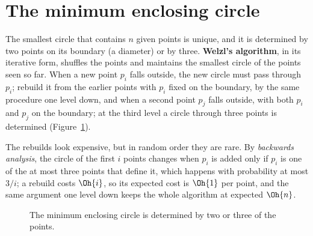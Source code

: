 \section[The minimum enclosing circle]{The minimum enclosing circle \hfill \ioi}\label{sec:mincircle}

The smallest circle that contains $n$ given points is unique, and it is determined by two points on its boundary (a diameter) or by
three. \textbf{Welzl's algorithm}, in its iterative form, shuffles the points and maintains the smallest circle of the points seen so far.
When a new point $p_i$ falls outside, the new circle must pass through $p_i$; rebuild it from the earlier points with $p_i$ fixed on the
boundary, by the same procedure one level down, and when a second point $p_j$ falls outside, with both $p_i$ and $p_j$ on the boundary; at
the third level a circle through three points is determined (Figure~\ref{fig:mincircle}).

The rebuilds look expensive, but in random order they are rare. By \emph{backwards analysis}, the circle of the first $i$ points changes
when $p_i$ is added only if $p_i$ is one of the at most three points that define it, which happens with probability at most $3/i$; a
rebuild costs $\Oh{i}$, so its expected cost is $\Oh{1}$ per point, and the same argument one level down keeps the whole algorithm at
expected $\Oh{n}$.

\begin{figure}[htbp]
\centering
{}
\caption{The minimum enclosing circle is determined by two or three of the points.}
\label{fig:mincircle}
\end{figure}

